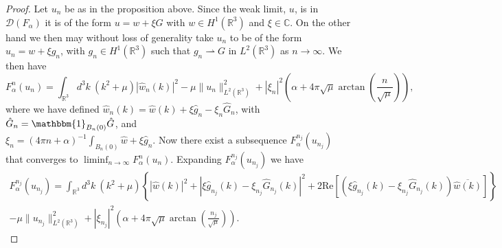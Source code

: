 \documentclass[a4paper,11pt]{article}
\newcommand{\Real}{\text{Re}}
\newcommand{\dom}[1]{\mathscr D\left(#1\right)}
\newcommand{\R}{\mathbb{R}}
\newcommand{\C}{\mathbb{C}}
\numberwithin{equation}{section}
\begin{document}
\begin{proof}
	Let $ u_n $ be as in the proposition above. Since the weak limit, $ u $, is in $ \dom{F_\alpha} $ it is of the form $ u=w+\xi G $ with $ w\in H^1(\R^3) $ and $ \xi\in\C $. On the other hand we then may without loss of generality take $ u_n $ to be of the form $ u_n=w+\xi g_n $, with $ g_n\in H^1(\R^3) $ such that $ g_n\rightharpoonup G $ in $ L^2(\R^3) $ as $ n\to\infty $. We then have \begin{equation}
	F_\alpha^n(u_n)=\int_{\R^3} d^3k\ \left(k^2+\mu\right)|\hat{w}_n(k)|^2-\mu\|u_n\|^2_{L^2(\R^3)}+|\xi_n|^2\left(\alpha+4\pi\sqrt{\mu}\arctan\left(\frac{n}{\sqrt{\mu}}\right)\right),
	\end{equation}
	where we have defined $ \hat{w}_n(k)=\hat{w}(k)+\xi\hat{g}_n-\xi_n\hat{G}_n $, with $ \hat{G}_n=\mathbbm{1}_{B_n(0)}\hat{G} $, and \\$ \xi_n=(4\pi n+\alpha)^{-1}\int_{B_n(0)} \hat{w}+\xi \hat{g}_n $. Now there exist a subsequence $ F_\alpha^{n_j}(u_{n_j}) $ that converges to $ \liminf_{n\to\infty}F_\alpha^n(u_n) $. Expanding $ F_\alpha^{n_j}(u_{n_j}) $ we have \begin{equation}
	\begin{aligned}
	F_\alpha^{n_j}(u_{n_j})=\int_{\R^3} d^3k\ \left(k^2+\mu\right)\left\{|\hat{w}(k)|^2+|\xi \hat{g}_{n_j}(k)-\xi_{n_j}\hat{G}_{n_j}(k)|^2+2\Real\left[(\xi \hat{g}_{n_j}(k)-\xi_{n_j}\hat{G}_{n_j}(k))\overline{\hat{w}(k)}\right]\right\}\\-\mu\|u_{n_j}\|^2_{L^2(\R^3)}+|\xi_{n_j}|^2\left(\alpha+4\pi\sqrt{\mu}\arctan\left(\frac{n_j}{\sqrt{\mu}}\right)\right).
	\end{aligned}
	\end{equation}

\end{proof}
\end{document}
